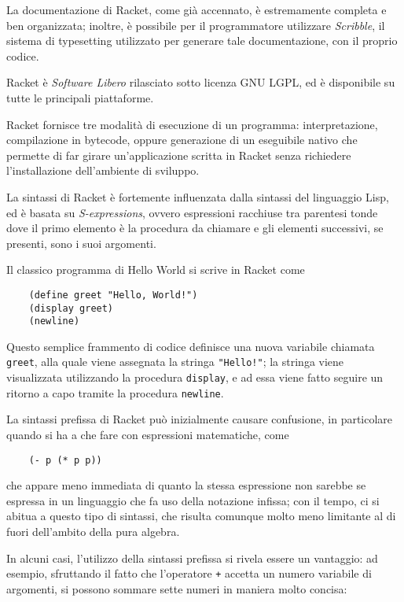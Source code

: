 La documentazione di Racket, come gi\`a accennato, \`e estremamente
completa e ben organizzata; inoltre, \`e possibile per il programmatore
utilizzare \emph{Scribble}, il sistema di typesetting utilizzato per
generare tale documentazione, con il proprio codice.

Racket \`e \emph{Software Libero} rilasciato sotto licenza GNU LGPL, ed
\`e disponibile su tutte le principali piattaforme.

Racket fornisce tre modalit\`a di esecuzione di un programma:
interpretazione, compilazione in bytecode, oppure generazione di un
eseguibile nativo che permette di far girare un'applicazione scritta in
Racket senza richiedere l'installazione dell'ambiente di sviluppo.

La sintassi di Racket \`e fortemente influenzata dalla sintassi del
linguaggio Lisp, ed \`e basata su \emph{S-expressions}, ovvero espressioni
racchiuse tra parentesi tonde dove il primo elemento \`e la procedura
da chiamare e gli elementi successivi, se presenti, sono i suoi
argomenti.

Il classico programma di Hello World si scrive in Racket come

\begin{lstlisting}
    (define greet "Hello, World!")
    (display greet)
    (newline)
\end{lstlisting}

Questo semplice frammento di codice definisce una nuova variabile
chiamata \lstinline{greet}, alla quale viene assegnata la stringa
\lstinline{"Hello!"}; la stringa viene visualizzata utilizzando la
procedura \lstinline{display}, e ad essa viene fatto seguire un
ritorno a capo tramite la procedura \lstinline{newline}.

La sintassi prefissa di Racket pu\`o inizialmente causare confusione,
in particolare quando si ha a che fare con espressioni matematiche,
come

\begin{lstlisting}
    (- p (* p p))
\end{lstlisting}

che appare meno immediata di quanto la stessa espressione non sarebbe
se espressa in un linguaggio che fa uso della notazione infissa; con il
tempo, ci si abitua a questo tipo di sintassi, che risulta comunque molto
meno limitante al di fuori dell'ambito della pura algebra.

In alcuni casi, l'utilizzo della sintassi prefissa si rivela essere un
vantaggio: ad esempio, sfruttando il fatto che l'operatore \lstinline{+}
accetta un numero variabile di argomenti, si possono sommare sette numeri
in maniera molto concisa:


